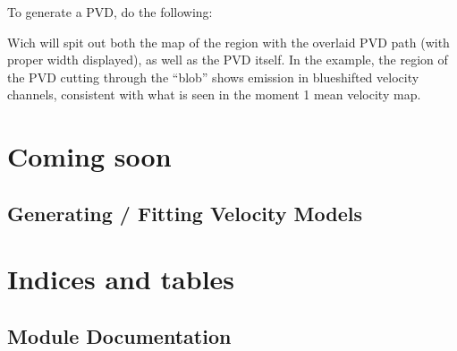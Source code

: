 \documentclass[letterpaper,10pt,english]{sphinxmanual}
\let\sphinxpxdimen\pdfpxdimen\else\newdimen\sphinxpxdimen
\begin{document}
\sphinxAtStartPar
To generate a PVD, do the following:

\begin{sphinxVerbatim}[commandchars=\\\{\}]
       
  
\end{sphinxVerbatim}

\sphinxAtStartPar
Wich will spit out both the map of the region with the overlaid PVD path (with proper width displayed), as
well as the PVD itself. In the example, the region of the PVD cutting through the “blob” shows emission in
blue\sphinxhyphen{}shifted velocity channels, consistent with what is seen in the moment 1 mean velocity map.

\noindent\sphinxincludegraphics[width=600\sphinxpxdimen]{{example_pvd}.png}


\chapter{Coming soon}
\label{\detokenize{index:coming-soon}}
\sphinxstepscope


\section{Generating / Fitting Velocity Models}
\label{\detokenize{modeling:generating-fitting-velocity-models}}\label{\detokenize{modeling::doc}}

\chapter{Indices and tables}
\label{\detokenize{index:indices-and-tables}}
\sphinxstepscope


\section{Module Documentation}
\label{\detokenize{modules:module-documentation}}\label{\detokenize{modules::doc}}
\end{document}
